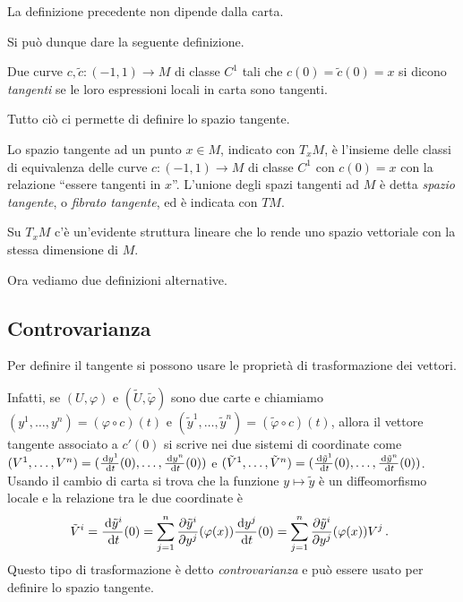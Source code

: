\begin{proposition}
	La definizione precedente non dipende dalla carta.
\end{proposition}

Si può dunque dare la seguente definizione.
 
\begin{definition} 
	Due curve $c,\tilde{c}:(-1,1)\to M$ di classe $C^1$ tali che $c(0)=\tilde{c}(0)=x$ si dicono \emph{tangenti} se le loro espressioni locali in carta sono tangenti.
\end{definition}

Tutto ciò ci permette di definire lo spazio tangente.
 
\begin{definition}  
	Lo spazio tangente ad un punto $x\in M$, indicato con $T_xM$, è l'insieme delle classi di equivalenza delle curve $c:(-1,1)\to M$ di classe $C^1$ con $c(0)=x$ con la relazione ``essere tangenti in $x$''. L'unione degli spazi tangenti ad $M$ è detta \emph{spazio tangente}, o \emph{fibrato tangente}, ed è indicata con $TM$.
\end{definition}
 
 \begin{remark}
  Su $T_xM$ c'è un'evidente struttura lineare che lo rende uno spazio vettoriale con la
  stessa dimensione di $M$.
 \end{remark}

Ora vediamo due definizioni alternative.
 
\subsection*{Controvarianza}
Per definire il tangente si possono usare le proprietà di trasformazione dei vettori.

Infatti, se $(U,\varphi)$ e $(\tilde{U},\tilde{\varphi})$ sono due carte e chiamiamo $(y^1,\dots,y^n)=(\varphi\circ c)(t)$ e $(\tilde{y}^1,\dots,\tilde{y}^n)=(\tilde{\varphi}\circ c)(t)$, allora il vettore tangente associato a $c'(0)$ si scrive nei due sistemi di coordinate come $(V^1,\dots,V^n)=(\frac{\,\mathrm d y^1}{\,\mathrm d t}(0),\dots,\frac{\,\mathrm d y^n}{\,\mathrm d t}(0))$ e $(\tilde{V}^1,\dots,\tilde{V}^n)=(\frac{\,\mathrm d\tilde{y}^1}{\,\mathrm d t}(0),\dots,\frac{\,\mathrm d\tilde{y}^n}{\,\mathrm d t}(0))$.
Usando il cambio di carta si trova che la funzione $y\mapsto\tilde{y}$ è un diffeomorfismo locale e la relazione tra le due coordinate è 
\begin{equation*}
	\tilde{V}^i=\frac{\,\mathrm d\tilde{y}^i}{\,\mathrm d t}(0)=\sum_{j=1}^n\frac{\partial\tilde{y}^i}{\partial y^j}(\varphi(x)) \frac{\,\mathrm d y^j}{\,\mathrm d t}(0)=\sum_{j=1}^n\frac{\partial\tilde{y}^i}{\partial y^j}(\varphi(x))V^j\, \text{. }
\end{equation*}
Questo tipo di trasformazione è detto \emph{controvarianza} e può essere usato per definire lo spazio tangente. 

